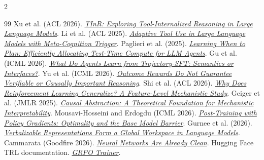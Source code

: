 \documentclass[11pt]{article}
\begin{document}
\vspace{-0.35em}
\begin{multicols}{2}
\begin{thebibliography}{99}\setlength{\itemsep}{0pt}\footnotesize
     Xu et al. (ACL 2026). \href{https://aclanthology.org/2026.acl-long.2077/}{\emph{TInR: Exploring Tool-Internalized Reasoning in Large Language Models}}.
     Li et al. (ACL 2025). \href{https://aclanthology.org/2025.acl-long.655/}{\emph{Adaptive Tool Use in Large Language Models with Meta-Cognition Trigger}}.
     Paglieri et al. (2025). \href{https://arxiv.org/abs/2509.03581}{\emph{Learning When to Plan: Efficiently Allocating Test-Time Compute for LLM Agents}}.
     Gu et al. (ICML 2026). \href{https://proceedings.mlr.press/v306/gu26g.html}{\emph{What Do Agents Learn from Trajectory-SFT: Semantics or Interfaces?}}.
     Yu et al. (ICML 2026). \href{https://proceedings.mlr.press/v306/yu26av.html}{\emph{Outcome Rewards Do Not Guarantee Verifiable or Causally Important Reasoning}}.
     Shi et al. (ACL 2026). \href{https://aclanthology.org/2026.acl-long.1808/}{\emph{Why Does Reinforcement Learning Generalize? A Feature-Level Mechanistic Study}}.
     Geiger et al. (JMLR 2025). \href{https://www.jmlr.org/beta/papers/v26/23-0058.html}{\emph{Causal Abstraction: A Theoretical Foundation for Mechanistic Interpretability}}.
     Mousavi-Hosseini and Erdogdu (ICML 2026). \href{https://proceedings.mlr.press/v306/mousavi-hosseini26a.html}{\emph{Post-Training with Policy Gradients: Optimality and the Base Model Barrier}}.
     Gurnee et al. (2026). \href{https://transformer-circuits.pub/2026/workspace/index.html}{\emph{Verbalizable Representations Form a Global Workspace in Language Models}}.
     Cammarata (Goodfire 2026). \href{https://already-clean.goodfire.com/}{\emph{Neural Networks Are Already Clean}}.
     Hugging Face TRL documentation. \href{https://huggingface.co/docs/trl/grpo_trainer}{\emph{GRPO Trainer}}.
  \end{thebibliography}
\end{multicols}
\end{document}
